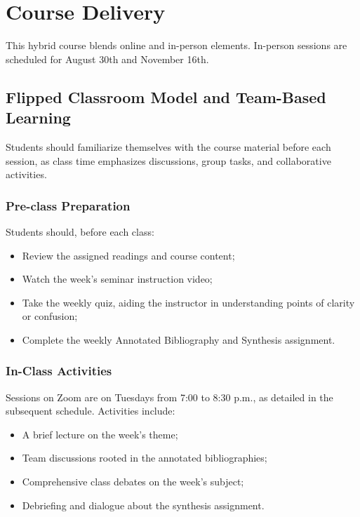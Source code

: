 \documentclass[12pt, letterpaper]{article}
\begin{document}
\section{Course Delivery}

This hybrid course blends online and in-person elements. In-person sessions are scheduled for August 30th and November 16th.

\subsection*{Flipped Classroom Model and Team-Based Learning}

Students should familiarize themselves with the course material before each session, as class time emphasizes discussions, group tasks, and collaborative activities.

\subsubsection*{Pre-class Preparation}

Students should, before each class:
    \begin{itemize}
        \item Review the assigned readings and course content;
        \item Watch the week's seminar instruction video;
        \item Take the weekly quiz, aiding the instructor in understanding points of clarity or confusion;
        \item Complete the weekly Annotated Bibliography and Synthesis assignment.
    \end{itemize}


\subsubsection*{In-Class Activities}

    Sessions on Zoom are on Tuesdays from 7:00 to 8:30 p.m., as detailed in the subsequent schedule. Activities include:

    \begin{itemize}
        \item A brief lecture on the week's theme;
        \item Team discussions rooted in the annotated bibliographies;
        \item Comprehensive class debates on the week's subject;
        \item Debriefing and dialogue about the synthesis assignment.
    \end{itemize}
    
\end{document}
